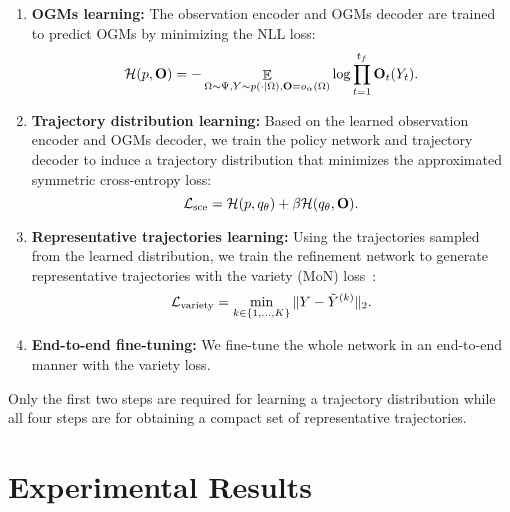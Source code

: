 \documentclass[10pt,twocolumn,letterpaper]{article}
\begin{document}
\begin{enumerate}
\vspace{-0.2cm}
\itemsep=-5pt
\item \textbf{OGMs learning:} The observation encoder and OGMs decoder are trained to predict OGMs by minimizing the NLL loss:
\begin{equation}
\mathcal{H}(p,\mathbf{O})=-\mathop{\mathbb{E}}\limits_{\Omega \sim \Psi,Y \sim p(\cdot|\Omega),\mathbf{O}=o_\alpha(\Omega)}\log \prod  \limits_{t=1}^{t_f}\mathbf{O}_t(Y_t). 
\label{eq:ogm-learning-loss}
\notag
\end{equation}

\item \textbf{Trajectory distribution learning:} Based on the learned observation encoder and OGMs decoder, we train the policy network and trajectory decoder to induce a trajectory distribution that minimizes the approximated symmetric cross-entropy loss:
\begin{equation}
\mathcal{L}_{\text{sce}}=\mathcal{H}(p,q_\theta)+\beta \mathcal{H}(q_\theta,\mathbf{O}). \notag
\label{eq:sce}
\end{equation}

\item \textbf{Representative trajectories learning:} Using the trajectories sampled from the learned distribution, we train the refinement network to generate representative trajectories with the variety (MoN) loss~\cite{gupta2018social}:
\begin{equation}
    \mathcal{L}_{\text{variety}}=\min_{k\in\{1,\dots,K\}}\|Y-\tilde{Y}^{(k)}\|_2. \notag
\end{equation}

\item \textbf{End-to-end fine-tuning:} We fine-tune the whole network in an end-to-end manner with the variety loss.
\vspace{-0.2cm}

\end{enumerate}

Only the first two steps are required for learning a trajectory distribution while all four steps are for obtaining a compact set of representative trajectories.

\section{Experimental Results}
\label{sec:experiment}
\end{document}

